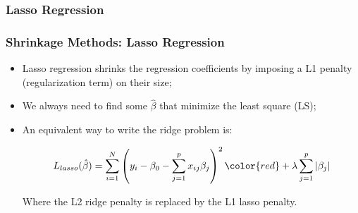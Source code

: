 \subsubsection {Lasso Regression}


\begin{frame}
    \frametitle{Shrinkage Methods: Lasso Regression}
 
    \begin{itemize}
        \item Lasso regression shrinks the regression coefficients by imposing a 
        L1 penalty (regularization term) on their size;

        \item We always need to find some $\hat{\beta}$ that minimize the least square (LS);

        \item An equivalent way to write the ridge problem is:

        $$L_{lasso}(\hat{\beta}) = \sum_{i=1}^{N}\left(y_i - \beta_0 - \sum_{j=1}^{p}x_{ij}\beta_j\right)^2 {\color{red} + \lambda\sum_{j=1}^{p}|\beta_{j}| }$$ 

        Where the L2 ridge penalty is replaced by the L1 lasso penalty.

    \end{itemize}

\end{frame}
